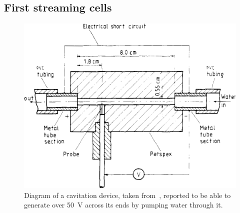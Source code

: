   \subsection{First streaming cells}


    \begin{figure}
      \centering
      \includegraphics{content/pt1/01-PowerHarvesting/graphics/VargaSeymour1986_cell}
      \caption[Diagram of a cavitation device, taken from~\cite{Varga1986}]{\label{fig:first_cell_diagram}Diagram of a cavitation device, taken from~\cite{Varga1986}, reported to be able to generate over \SI{50}{\volt} across its ends by pumping water through it.}
    \end{figure}

